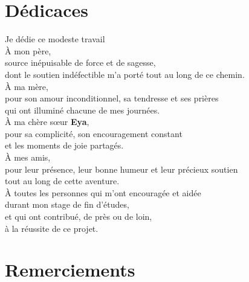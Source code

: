 \documentclass[12pt,a4paper,twoside]{report}
\begin{document}
\chapter*{Dédicaces}

\vspace{3cm}

\begin{center}
\itshape\large

Je dédie ce modeste travail\\[0.6cm]

À mon père,\\
source inépuisable de force et de sagesse,\\
dont le soutien indéfectible m'a porté tout au long de ce chemin.\\[0.6cm]

À ma mère,\\
pour son amour inconditionnel, sa tendresse et ses prières\\
qui ont illuminé chacune de mes journées.\\[0.6cm]

À ma chère sœur \textbf{Eya},\\
pour sa complicité, son encouragement constant\\
et les moments de joie partagés.\\[0.6cm]

À mes amis,\\
pour leur présence, leur bonne humeur et leur précieux soutien\\
tout au long de cette aventure.\\[0.6cm]

À toutes les personnes qui m'ont encouragée et aidée\\
durant mon stage de fin d'études,\\
et qui ont contribué, de près ou de loin,\\
à la réussite de ce projet.

\end{center}

\newpage

\chapter*{Remerciements}
\end{document}
